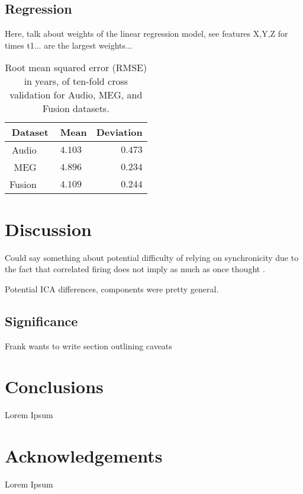 \documentclass[a4paper]{article}
\begin{document}
\subsection{Regression}

Here, talk about weights of the linear regression model, see features X,Y,Z for times t1... are the largest weights...

\begin{table}[t]
  \caption{Root mean squared error (RMSE) in years, of ten-fold cross validation for Audio, MEG, and Fusion datasets.}
  \label{tab:rmse}
  \centering
  \begin{tabular}{ r@{}l  r }
    \toprule
    \multicolumn{1}{c}{\textbf{Dataset}} & \multicolumn{1}{c}{\textbf{Mean}} & \multicolumn{1}{c}{\textbf{Deviation}} \\
    \midrule
    Audio~~~                        & $4.103$         &     $0.473$       \\
    MEG~~~                          & $4.896$         &     $0.234$       \\
    Fusion~~~                       & $4.109$         &     $0.244$       \\
    \bottomrule
  \end{tabular}
\end{table}

\section{Discussion}

Could say something about potential difficulty of relying on synchronicity due to the fact that correlated firing does not imply as much as once thought \cite{Moreno-Bote2014}.

Potential ICA differences, components were pretty general.

\subsection{Significance}

Frank wants to write section outlining caveats

\section{Conclusions}

Lorem Ipsum

\section{Acknowledgements}

Lorem Ipsum





\end{document}
